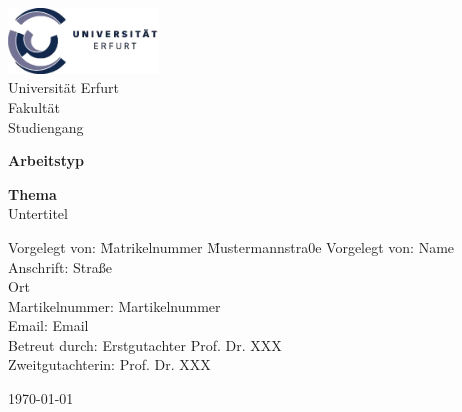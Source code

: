 \documentclass[
	a4paper,%
	oneside,%
	12pt,%
	halfparskip,%
	headinclude,%
	headsepline,%
	plainheadsepline,
	footsepline, %
	plainfootsepline,
	bibtotoc,%
	liststotoc,%
	toc=bibliography,
	]{scrbook}
\date{\today}
\begin{document}


\begin{titlepage}
 \thispagestyle{empty}
  \includegraphics[width=0.30\textwidth]{pics/Logo_Universitaet_Erfurt.png}\\
	Universität Erfurt \\
	Fakultät \\
	Studiengang

	\vfill{}

	\begin{center}
			\Huge\textbf{Arbeitstyp}
	\end{center}

	\begin{center}
			\Huge\textbf{Thema} \\
			\Large Untertitel
	\end{center}

	\vfill{}

\begin{tabbing}
	Vorgelegt von:\hspace{0.5em} \= Matrikelnummer\hspace{0.7em} \=  Mustermannstra0e \kill
	Vorgelegt von: \+\> Name\\
		Anschrift: \+\> Straße \\
		\-Ort \\
	Martikelnummer: \> Martikelnummer \\
	\-Email: \> Email \\[2ex]
	Betreut durch: \+\> Erstgutachter \> Prof. Dr. XXX \\
						Zweitgutachterin: \> Prof. Dr. XXX \\
\end{tabbing}

\vspace{5ex}

\today{}

\end{titlepage}
\end{document}
